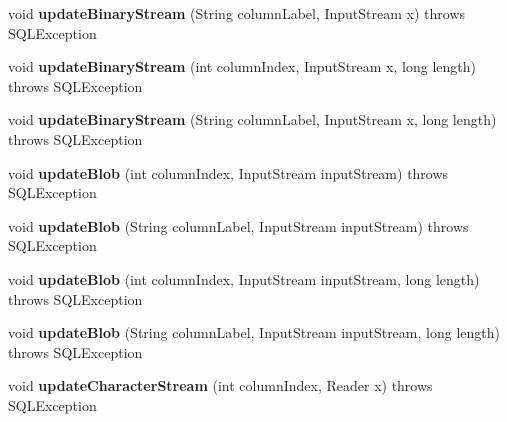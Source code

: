 \begin{DoxyCompactItemize}
void {\bfseries update\+Binary\+Stream} (String column\+Label, Input\+Stream x)  throws S\+Q\+L\+Exception 
\item 
\mbox{\label{classcom_1_1mysql_1_1jdbc_1_1_j_d_b_c4_result_set_a2c9c1f4672e8aa100a9e4e797d6a806b}} 
void {\bfseries update\+Binary\+Stream} (int column\+Index, Input\+Stream x, long length)  throws S\+Q\+L\+Exception 
\item 
\mbox{\label{classcom_1_1mysql_1_1jdbc_1_1_j_d_b_c4_result_set_a8a62ea14f050f829aa913495724b71fc}} 
void {\bfseries update\+Binary\+Stream} (String column\+Label, Input\+Stream x, long length)  throws S\+Q\+L\+Exception 
\item 
\mbox{\label{classcom_1_1mysql_1_1jdbc_1_1_j_d_b_c4_result_set_a4b72762b01af92a7455e45eb11901dfa}} 
void {\bfseries update\+Blob} (int column\+Index, Input\+Stream input\+Stream)  throws S\+Q\+L\+Exception 
\item 
\mbox{\label{classcom_1_1mysql_1_1jdbc_1_1_j_d_b_c4_result_set_af5ba8c5c7ad3eb0c0bbd62a7ace6baed}} 
void {\bfseries update\+Blob} (String column\+Label, Input\+Stream input\+Stream)  throws S\+Q\+L\+Exception 
\item 
\mbox{\label{classcom_1_1mysql_1_1jdbc_1_1_j_d_b_c4_result_set_ac462c1715bf0ca125e5487b762ccea26}} 
void {\bfseries update\+Blob} (int column\+Index, Input\+Stream input\+Stream, long length)  throws S\+Q\+L\+Exception 
\item 
\mbox{\label{classcom_1_1mysql_1_1jdbc_1_1_j_d_b_c4_result_set_adeaa9d59c0a41e9e8a3cdaf1e9d9e1d6}} 
void {\bfseries update\+Blob} (String column\+Label, Input\+Stream input\+Stream, long length)  throws S\+Q\+L\+Exception 
\item 
\mbox{\label{classcom_1_1mysql_1_1jdbc_1_1_j_d_b_c4_result_set_a3254b0d6fc52ff1c3680b9ac11ff3c1e}} 
void {\bfseries update\+Character\+Stream} (int column\+Index, Reader x)  throws S\+Q\+L\+Exception 

\end{DoxyCompactItemize}
